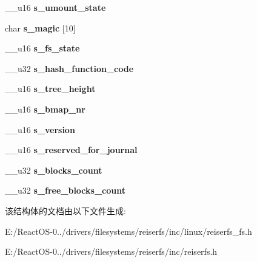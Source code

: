 \begin{DoxyCompactItemize}
\+\_\+\+\_\+u16 {\bfseries s\+\_\+umount\+\_\+state}
\item 
\mbox{\label{structreiserfs__super__block__v1_a9b6b960f3a5fa78f13b394d91fec2bc2}} 
char {\bfseries s\+\_\+magic} \mbox{[}10\mbox{]}
\item 
\mbox{\label{structreiserfs__super__block__v1_a2dd14431eb8c548ba6e5a426cfadba89}} 
\+\_\+\+\_\+u16 {\bfseries s\+\_\+fs\+\_\+state}
\item 
\mbox{\label{structreiserfs__super__block__v1_aac536a027006c1896f58e58c85bc1bc3}} 
\+\_\+\+\_\+u32 {\bfseries s\+\_\+hash\+\_\+function\+\_\+code}
\item 
\mbox{\label{structreiserfs__super__block__v1_a028ba9aa47025c5c9bd7a54fe13b8f18}} 
\+\_\+\+\_\+u16 {\bfseries s\+\_\+tree\+\_\+height}
\item 
\mbox{\label{structreiserfs__super__block__v1_a29c7057dc2e28bbf948d0dc0d8ce7dbc}} 
\+\_\+\+\_\+u16 {\bfseries s\+\_\+bmap\+\_\+nr}
\item 
\mbox{\label{structreiserfs__super__block__v1_aa981dc9ebe5b10ff2edbf1e02264883e}} 
\+\_\+\+\_\+u16 {\bfseries s\+\_\+version}
\item 
\mbox{\label{structreiserfs__super__block__v1_a8076d3737a5891d4f16f25377d88cfc5}} 
\+\_\+\+\_\+u16 {\bfseries s\+\_\+reserved\+\_\+for\+\_\+journal}
\item 
\mbox{\label{structreiserfs__super__block__v1_ab50518ee45aade42c6c30aed65f587cb}} 
\+\_\+\+\_\+u32 {\bfseries s\+\_\+blocks\+\_\+count}
\item 
\mbox{\label{structreiserfs__super__block__v1_a2a360df8201e4da374adc4c86555f6c9}} 
\+\_\+\+\_\+u32 {\bfseries s\+\_\+free\+\_\+blocks\+\_\+count}
\end{DoxyCompactItemize}


该结构体的文档由以下文件生成\+:\begin{DoxyCompactItemize}
\item 
E\+:/\+React\+O\+S-\/0../drivers/filesystems/reiserfs/inc/linux/reiserfs\+\_\+fs.\+h\item 
E\+:/\+React\+O\+S-\/0../drivers/filesystems/reiserfs/inc/reiserfs.\+h\end{DoxyCompactItemize}
